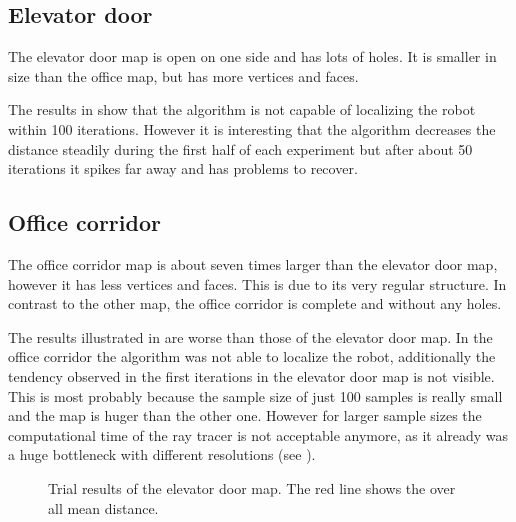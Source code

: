 \documentclass[Thesis.tex]{subfiles}
\begin{document}
\subsection*{Elevator door}
The elevator door map is open on one side and has lots of holes. It is smaller in size than the office map, but has more vertices and faces.

The results in  show that the algorithm is not capable of localizing the robot within 100 iterations. However it is interesting that the algorithm decreases the distance steadily during the first half of each experiment but after about 50 iterations it spikes far away and has problems to recover.

\subsection*{Office corridor}
The office corridor map is about seven times larger than the elevator door map, however it has less vertices and faces. This is due to its very regular structure. In contrast to the other map, the office corridor is complete and without any holes. 

The results illustrated in  are worse than those of the elevator door map. In the office corridor the algorithm was not able to localize the robot, additionally the tendency observed in the first iterations in the elevator door map is not visible. This is most probably because the sample size of just 100 samples is really small and the map is huger than the other one. However for larger sample sizes the computational time of the ray tracer is not acceptable anymore, as it already was a huge bottleneck with different resolutions (see ).

\begin{figure}
\centering
{}
\caption[Results elevator door map]{Trial results of the elevator door map. The red line shows the over all mean distance.}
\label{fig:reselv}
\end{figure}
\end{document}
